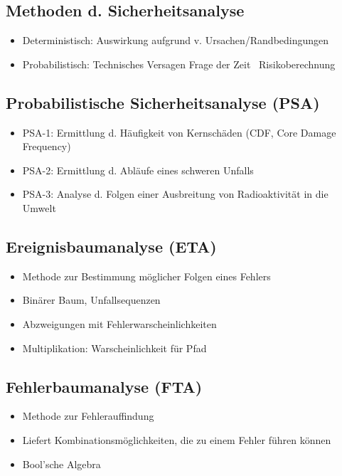 \documentclass[12pt]{article}
\begin{document}
\subsection{Methoden d. Sicherheitsanalyse}
\begin{itemize}
  \item Deterministisch: Auswirkung aufgrund v. Ursachen/Randbedingungen
  \item Probabilistisch: Technisches Versagen Frage der Zeit \textrightarrow\ Risikoberechnung
\end{itemize}

\subsection{Probabilistische Sicherheitsanalyse (PSA)}
\begin{itemize}
  \item PSA-1: Ermittlung d. Häufigkeit von Kernschäden (CDF, Core Damage Frequency)
  \item PSA-2: Ermittlung d. Abläufe eines schweren Unfalls
  \item PSA-3: Analyse d. Folgen einer Ausbreitung von Radioaktivität in die Umwelt
\end{itemize}

\subsection{Ereignisbaumanalyse (ETA)}
\begin{itemize}
  \item Methode zur Bestimmung möglicher Folgen eines Fehlers
  \item Binärer Baum, Unfallsequenzen
  \item Abzweigungen mit Fehlerwarscheinlichkeiten
  \item Multiplikation: Warscheinlichkeit für Pfad
\end{itemize}

\subsection{Fehlerbaumanalyse (FTA)}
\begin{itemize}
  \item Methode zur Fehlerauffindung
  \item Liefert Kombinationsmöglichkeiten, die zu einem Fehler führen können
  \item Bool'sche Algebra
\end{itemize}
\end{document}

